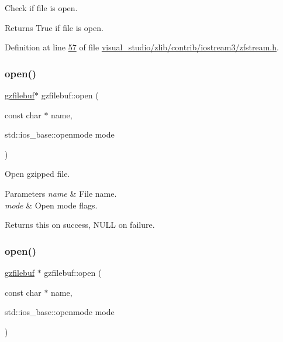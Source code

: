 Check if file is open. 

\begin{DoxyReturn}{Returns}
True if file is open. 
\end{DoxyReturn}


Definition at line \hyperlink{visual__studio_2zlib_2contrib_2iostream3_2zfstream_8h_source_l00057}{57} of file \hyperlink{visual__studio_2zlib_2contrib_2iostream3_2zfstream_8h_source}{visual\+\_\+studio/zlib/contrib/iostream3/zfstream.\+h}.

\mbox{\label{classgzfilebuf_a78281ba60675bf8727e92ed23b4a2cc9}} 
\subsubsection{\texorpdfstring{open()}{open()}\hspace{0.1cm}{\footnotesize\ttfamily [1/2]}}
{\footnotesize\ttfamily \hyperlink{classgzfilebuf}{gzfilebuf}$\ast$ gzfilebuf\+::open (\begin{DoxyParamCaption}\item[{const char $\ast$}]{name,  }\item[{std\+::ios\+\_\+base\+::openmode}]{mode }\end{DoxyParamCaption})}



Open gzipped file. 


\begin{DoxyParams}{Parameters}
{\em name} & File name. \\
\hline
{\em mode} & Open mode flags. \\
\hline
\end{DoxyParams}
\begin{DoxyReturn}{Returns}
{\ttfamily this} on success, N\+U\+LL on failure. 
\end{DoxyReturn}
\mbox{\label{classgzfilebuf_a9582843a0caa22cb1b4ead1c687dabb2}} 
\subsubsection{\texorpdfstring{open()}{open()}\hspace{0.1cm}{\footnotesize\ttfamily [2/2]}}
{\footnotesize\ttfamily \hyperlink{classgzfilebuf}{gzfilebuf} $\ast$ gzfilebuf\+::open (\begin{DoxyParamCaption}\item[{const char $\ast$}]{name,  }\item[{std\+::ios\+\_\+base\+::openmode}]{mode }\end{DoxyParamCaption})}



